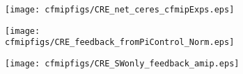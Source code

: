 \documentclass[varwidth, border=10pt]{standalone}
\begin{document}

\begin{figure}
  \centering
  \begin{subfigure}{0.31\textwidth}
  \centering
  \texttt{[image: cfmipfigs/CRE\_net\_ceres\_cfmipExps.eps]}
\end{subfigure}

\begin{subfigure}{0.31\textwidth}
\centering
  \texttt{[image: cfmipfigs/CRE\_feedback\_fromPiControl\_Norm.eps]}
\end{subfigure}

\begin{subfigure}{0.31\textwidth}
\centering
  \texttt{[image: cfmipfigs/CRE\_SWonly\_feedback\_amip.eps]}
\end{subfigure}
\end{figure}
\end{document}
